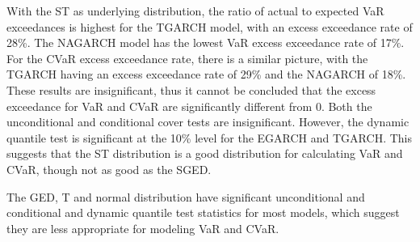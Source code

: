 \documentclass[a4paper, twoside]{templates/ociamthesis}
\begin{document}
With the ST as underlying distribution, the ratio of actual to expected VaR exceedances is highest for the TGARCH model, with an excess exceedance rate of 28\%. The NAGARCH model has the lowest VaR excess exceedance rate of 17\%. For the CVaR excess exceedance rate, there is a similar picture, with the TGARCH having an excess exceedance rate of 29\% and the NAGARCH of 18\%. These results are insignificant, thus it cannot be concluded that the excess exceedance for VaR and CVaR are significantly different from 0. Both the unconditional and conditional cover tests are insignificant. However, the dynamic quantile test is significant at the 10\% level for the EGARCH and TGARCH. This suggests that the ST distribution is a good distribution for calculating VaR and CVaR, though not as good as the SGED.

The GED, T and normal distribution have significant unconditional and conditional and dynamic quantile test statistics for most models, which suggest they are less appropriate for modeling VaR and CVaR.

\newpage
\end{document}
